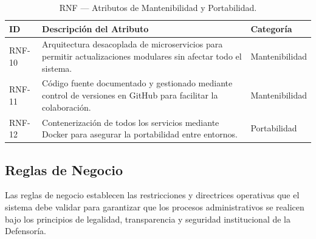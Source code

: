 \documentclass[12pt, oneside, letterpaper]{book}
\begin{document}
\begin{table}[H]
\centering
\caption{RNF — Atributos de Mantenibilidad y Portabilidad.}
\begin{tabularx}{\textwidth}{@{} l L l @{}}
\toprule
{}
\textbf{\color{white} ID} & \textbf{\color{white} Descripción del Atributo} & \textbf{\color{white} Categoría} \\ \midrule
{}
RNF-10 & Arquitectura desacoplada de microservicios para permitir actualizaciones modulares sin afectar todo el sistema. & Mantenibilidad \\
RNF-11 & Código fuente documentado y gestionado mediante control de versiones en GitHub para facilitar la colaboración. & Mantenibilidad \\
RNF-12 & Contenerización de todos los servicios mediante Docker para asegurar la portabilidad entre entornos. & Portabilidad \\ \bottomrule
\end{tabularx}
\end{table}


\subsection{Reglas de Negocio}

Las reglas de negocio establecen las restricciones y directrices operativas
que el sistema debe validar para garantizar que los procesos administrativos
se realicen bajo los principios de legalidad, transparencia y seguridad
institucional de la Defensoría.
\end{document}
